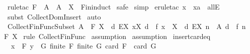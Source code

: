 \begin{isabellebody}
\isamarkupfalse%
\ {\isacharparenleft}rule{\isacharunderscore}tac\ F\ {\isacharequal}\ {\isachardoublequoteopen}A{\isachardoublequoteclose}\ \ A\ {\isacharequal}\ {\isachardoublequoteopen}X{\isachardoublequoteclose}\ \ Fin{\isacharunderscore}induct{\isacharparenright}\isanewline
{}\isamarkupfalse%
\ safe\isanewline
{}\isamarkupfalse%
\ simp\isanewline
{}\isamarkupfalse%
\ {\isacharparenleft}erule{\isacharunderscore}tac\ x\ {\isacharequal}\ {\isachardoublequoteopen}xa{\isachardoublequoteclose}\ \ allE{\isacharparenright}\isanewline
{}\isamarkupfalse%
\ {\isacharparenleft}subst\ Collect{\isacharunderscore}Dom{\isacharunderscore}Insert{\isacharparenright}\isanewline
{}\isamarkupfalse%
\ auto\isanewline
{}\isamarkupfalse%
%
\endisatagproof
{\isafoldproof}%
%
\isadelimproof
\isanewline
%
\endisadelimproof
\isanewline
{}\isamarkupfalse%
\ Collect{\isacharunderscore}Fin{\isacharunderscore}Func{\isacharunderscore}Subset{\isacharcolon}\ {\isachardoublequoteopen}{\isacharbrackleft}{\isacharbar}A\ {\isacharcolon}\ {\isacharpercent}F\ X\ {\isacharsemicolon}\ {\isacharbraceleft}d{\isachardot}\ EX\ x{\isacharcolon}X{\isachardot}\ d\ {\isacharequal}\ f\ x{\isacharbraceright}\ {\isacharless}{\isacharequal}\ X{\isacharbar}{\isacharbrackright}\ {\isacharequal}{\isacharequal}{\isachargreater}\ {\isacharbraceleft}d{\isachardot}\ EX\ n\ {\isacharcolon}\ A{\isachardot}\ d\ {\isacharequal}\ {\isacharparenleft}f\ n{\isacharparenright}\ {\isacharbraceright}\ {\isacharcolon}\ {\isacharpercent}F\ X{\isachardoublequoteclose}\isanewline
%
\isadelimproof
%
\endisadelimproof
%
\isatagproof
{}\isamarkupfalse%
\ {\isacharparenleft}rule\ Collect{\isacharunderscore}Fin{\isacharunderscore}Func{\isacharparenright}\isanewline
{}\isamarkupfalse%
\ assumption\isanewline
{}\isamarkupfalse%
\ assumption\isanewline
{}\isamarkupfalse%
%
\endisatagproof
{\isafoldproof}%
%
\isadelimproof
\isanewline
%
\endisadelimproof
\isanewline
{}\isamarkupfalse%
\ insert{\isacharunderscore}card{\isacharunderscore}eq{\isacharcolon}\ \isanewline
\ \ {\isachardoublequoteopen}{\isacharbrackleft}{\isacharbar}x\ {\isachartilde}{\isacharcolon}\ F{\isacharsemicolon}\ y\ {\isachartilde}{\isacharcolon}\ G{\isacharsemicolon}\ finite\ F{\isacharsemicolon}\ finite\ G{\isacharsemicolon}\ card\ F\ {\isacharequal}\ card\ G{\isacharbar}{\isacharbrackright}\ {\isacharequal}{\isacharequal}{\isachargreater}\ \isanewline

\end{isabellebody}
